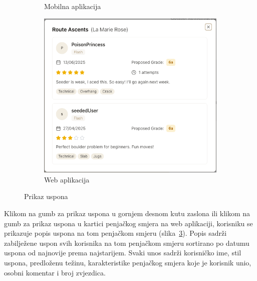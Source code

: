 \begin{figure}[H]
\begin{subfigure}[b]{0.38\textwidth}
        \caption{Mobilna aplikacija}
        \label{fig:prikaz_uspona_mob}
    \end{subfigure}
    \hfill
    \begin{subfigure}[b]{0.55\textwidth}
        \centering
        \includegraphics[width=\textwidth]{images/implementacija/web/route-details/view-ascents.png}
        \caption{Web aplikacija}
        \label{fig:prikaz_uspona_web}
    \end{subfigure}
    \caption{Prikaz uspona}
    \label{fig:prikaz_uspona}
\end{figure}

Klikom na gumb za prikaz uspona u gornjem desnom kutu zaslona ili klikom na gumb za prikaz uspona u kartici penjačkog smjera na web aplikaciji, korisniku se prikazuje popis uspona na tom penjačkom smjeru (slika~\ref{fig:prikaz_uspona}). Popis sadrži zabilježene uspon svih korisnika na tom penjačkom smjeru sortirano po datumu uspona od najnovije prema najstarijem. Svaki unos sadrži korisničko ime, stil uspona, predloženu težinu, karakteristike penjačkog smjera koje je korisnik unio, osobni komentar i broj zvjezdica.
